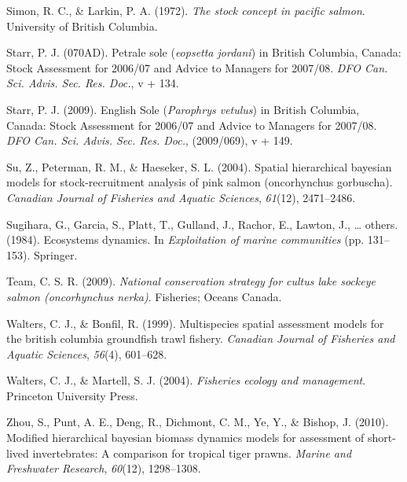 \documentclass[12pt,]{scrartcl}
\begin{document}
\hypertarget{ref-simon1972stock}{}
Simon, R. C., \& Larkin, P. A. (1972). \emph{The stock concept in
pacific salmon}. University of British Columbia.

\hypertarget{ref-starr2009petrale-so}{}
Starr, P. J. (070AD). Petrale sole (\emph{eopsetta jordani}) in British
Columbia, Canada: Stock Assessment for 2006/07 and Advice to Managers
for 2007/08. \emph{DFO Can. Sci. Advis. Sec. Res. Doc.}, v + 134.

\hypertarget{ref-starr2009english-so}{}
Starr, P. J. (2009). English Sole (\emph{Parophrys vetulus}) in British
Columbia, Canada: Stock Assessment for 2006/07 and Advice to Managers
for 2007/08. \emph{DFO Can. Sci. Advis. Sec. Res. Doc.}, (2009/069), v +
149.

\hypertarget{ref-su2004spatial}{}
Su, Z., Peterman, R. M., \& Haeseker, S. L. (2004). Spatial hierarchical
bayesian models for stock-recruitment analysis of pink salmon
(oncorhynchus gorbuscha). \emph{Canadian Journal of Fisheries and
Aquatic Sciences}, \emph{61}(12), 2471--2486.

\hypertarget{ref-sugihara1984ecosystems}{}
Sugihara, G., Garcia, S., Platt, T., Gulland, J., Rachor, E., Lawton,
J., \ldots{} others. (1984). Ecosystems dynamics. In \emph{Exploitation
of marine communities} (pp. 131--153). Springer.

\hypertarget{ref-team2009national}{}
Team, C. S. R. (2009). \emph{National conservation strategy for cultus
lake sockeye salmon (oncorhynchus nerka)}. Fisheries; Oceans Canada.

\hypertarget{ref-walters1999multispecies}{}
Walters, C. J., \& Bonfil, R. (1999). Multispecies spatial assessment
models for the british columbia groundfish trawl fishery. \emph{Canadian
Journal of Fisheries and Aquatic Sciences}, \emph{56}(4), 601--628.

\hypertarget{ref-walters2004fisheries}{}
Walters, C. J., \& Martell, S. J. (2004). \emph{Fisheries ecology and
management}. Princeton University Press.

\hypertarget{ref-zhou2010modified}{}
Zhou, S., Punt, A. E., Deng, R., Dichmont, C. M., Ye, Y., \& Bishop, J.
(2010). Modified hierarchical bayesian biomass dynamics models for
assessment of short-lived invertebrates: A comparison for tropical tiger
prawns. \emph{Marine and Freshwater Research}, \emph{60}(12),
1298--1308.
\end{document}

